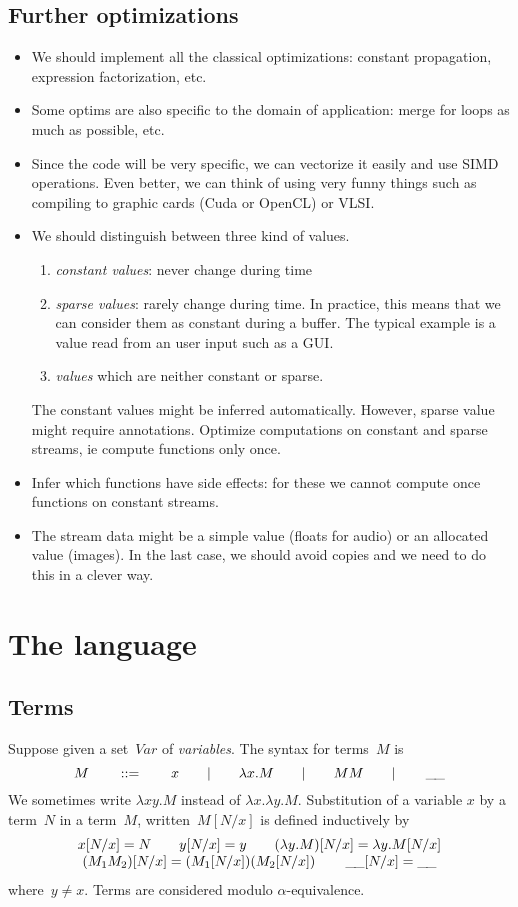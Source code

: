 \documentclass[a4paper,titlepage]{article}
\newcommand{\Var}{Var}
\newcommand{\ret}{\mathop{\_\hspace{-.3ex}\_}}
\begin{document}
\subsection{Further optimizations}
\begin{itemize}
\item We should implement all the classical optimizations: constant propagation,
  expression factorization, etc.
\item Some optims are also specific to the domain of application: merge for
  loops as much as possible, etc.
\item Since the code will be very specific, we can vectorize it easily and use
  SIMD operations. Even better, we can think of using very funny things such as
  compiling to graphic cards (Cuda or OpenCL) or VLSI.
\item We should distinguish between three kind of values.
  \begin{enumerate}
  \item \emph{constant values}: never change during time
  \item \emph{sparse values}: rarely change during time. In practice, this means
    that we can consider them as constant during a buffer. The typical example
    is a value read from an user input such as a GUI.
  \item \emph{values} which are neither constant or sparse.
  \end{enumerate}
  The constant values might be inferred automatically. However, sparse value
  might require annotations. Optimize computations on constant and sparse
  streams, ie compute functions only once.
\item Infer which functions have side effects: for these we cannot compute once
  functions on constant streams.
\item The stream data might be a simple value (floats for audio) or an allocated
  value (images). In the last case, we should avoid copies and we need to do
  this in a clever way.
\end{itemize}

\section{The language}
\subsection{Terms}
Suppose given a set~$\Var$ of \emph{variables}. The syntax for terms~$M$ is
\[
M
\qquad::=\qquad
x
\qquad|\qquad
\lambda x.M
\qquad|\qquad
MM
\qquad|\qquad
\ret
\]
We sometimes write $\lambda xy.M$ instead of $\lambda x.\lambda
y.M$. Substitution of a variable $x$ by a term~$N$ in a term~$M$,
written~$M[N/x]$ is defined inductively by
\[
\begin{array}{c}
  x[N/x]=N
  \qquad
  y[N/x]=y
  \qquad
  (\lambda y.M)[N/x]=\lambda y.M[N/x]
  \\
  (M_1M_2)[N/x]=(M_1[N/x])(M_2[N/x])
  \qquad
  \ret[N/x]=\ret
\end{array}
\]
where~$y\neq x$. Terms are considered modulo $\alpha$-equivalence.
\end{document}
